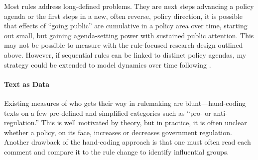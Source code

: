 Most rules address long-defined problems. They are next steps advancing a policy agenda \citep{West2013} or the first steps in a new, often reverse, policy direction, it is possible that effects of ``going public'' are cumulative in a policy area over time, starting out small, but gaining agenda-setting power with sustained public attention. This may not be possible to measure with the rule-focused research design outlined above. However, if sequential rules can be linked to distinct policy agendas, my strategy could be extended to model dynamics over time following \citet{Brookhart2015}.




\paragraph{Text as Data}
Existing measures of who gets their way in rulemaking are blunt---hand-coding texts on a few pre-defined and simplified categories such as ``pro- or anti-regulation.'' This is well motivated by theory, but in practice, it is often unclear whether a policy, on its face, increases or decreases government regulation.%
Another drawback of the hand-coding approach is that one must often read each comment and compare it to the rule change to identify influential groups. %


